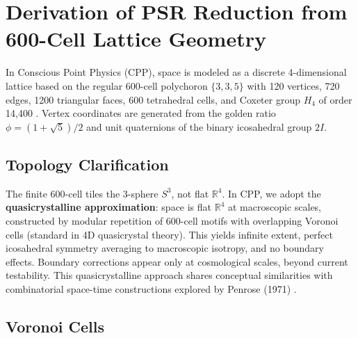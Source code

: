 \documentclass[11pt,letterpaper]{article}
\begin{document}
\appendix

\section{Derivation of PSR Reduction from 600-Cell Lattice Geometry}

In Conscious Point Physics (CPP), space is modeled as a discrete 4-dimensional lattice based on the regular 600-cell polychoron $\{3,3,5\}$ with 120 vertices, 720 edges, 1200 triangular faces, 600 tetrahedral cells, and Coxeter group $H_4$ of order 14,400 \cite{coxeter1973}. Vertex coordinates are generated from the golden ratio $\phi = (1 + \sqrt{5})/2$ and unit quaternions of the binary icosahedral group $2I$.

\subsection{Topology Clarification}

The finite 600-cell tiles the 3-sphere $S^3$, not flat $\mathbb{R}^4$. In CPP, we adopt the \textbf{quasicrystalline approximation}: space is flat $\mathbb{R}^4$ at macroscopic scales, constructed by modular repetition of 600-cell motifs with overlapping Voronoi cells (standard in 4D quasicrystal theory). This yields infinite extent, perfect icosahedral symmetry averaging to macroscopic isotropy, and no boundary effects. Boundary corrections appear only at cosmological scales, beyond current testability. This quasicrystalline approach shares conceptual similarities with combinatorial space-time constructions explored by Penrose (1971) \cite{penrose1971}.

\subsection{Voronoi Cells}
\end{document}
